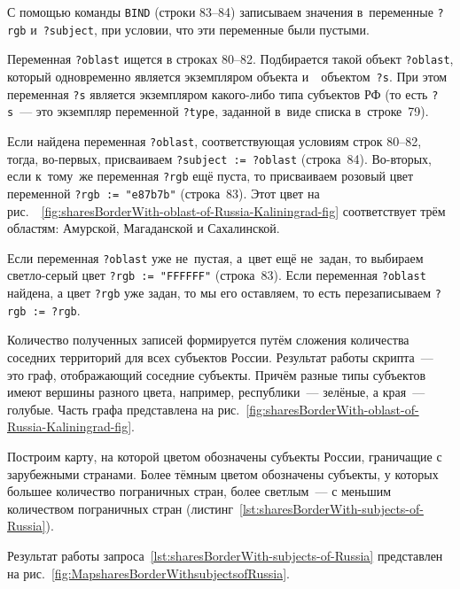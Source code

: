 С помощью команды \lstinline|BIND| (строки 83--84) 
записываем значения в~переменные \lstinline|?rgb| и~\mbox{\lstinline|?subject|}, 
при условии, что эти переменные были пустыми. 

Переменная \lstinline|?oblast| ищется в строках 80--82. 
Подбирается такой объект \lstinline|?oblast|, 
который одновременно является 
экземпляром объекта  
и~~объектом~\lstinline|?s|. 
При этом переменная \lstinline|?s| является экземпляром какого-либо типа субъектов РФ 
(то есть \lstinline|?s|~--- это экземпляр переменной \lstinline|?type|, 
заданной в~виде списка в~строке~79).

Если найдена переменная \lstinline|?oblast|, 
соответствующая условиям строк 80--82, 
тогда, во-первых, присваиваем \lstinline|?subject := ?oblast| (строка~84). 
Во-вторых, если к~тому~же переменная \lstinline|?rgb| ещё пуста, 
то присваиваем розовый цвет переменной \lstinline|?rgb := "e87b7b"| (строка~83). 
Этот цвет на рис.~\protect~\ref{fig:sharesBorderWith-oblast-of-Russia-Kaliningrad-fig} 
соответствует трём областям: Амурской, Магаданской и Сахалинской. 

Если переменная \lstinline|?oblast| уже не~пустая, а~цвет ещё не~задан, 
то выбираем светло-серый цвет \lstinline|?rgb := "FFFFFF"| (строка~83).
Если переменная \lstinline|?oblast| найдена, а цвет \lstinline|?rgb| уже задан, 
то мы его оставляем, то есть перезаписываем \lstinline|?rgb := ?rgb|.

Количество полученных записей формируется путём сложения количества соседних территорий для всех субъектов России. 
Результат работы скрипта~--- это граф, 
отображающий соседние субъекты. 
Причём разные типы субъектов имеют вершины разного цвета, например, 
республики~--- зелёные, а края~--- голубые. 
Часть графа представлена на рис.~\ref{fig:sharesBorderWith-oblast-of-Russia-Kaliningrad-fig}.%




\newpage
Построим карту, на которой цветом обозначены субъекты России, 
граничащие с зарубежными странами. 
Более тёмным цветом обозначены субъекты, у которых большее количество пограничных стран, 
более светлым~--- с меньшим количеством пограничных стран (листинг~\ref{lst:sharesBorderWith-subjects-of-Russia}).

Результат работы запроса~\ref{lst:sharesBorderWith-subjects-of-Russia} 
представлен на рис.~\ref{fig:MapsharesBorderWithsubjectsofRussia}.


